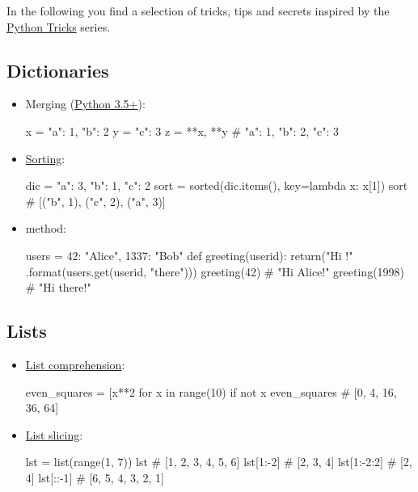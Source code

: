 \documentclass[rules]{cheatsheet}
\begin{document}
In the following you find a selection of tricks, tips and secrets inspired by the \href{https://realpython.com/python-tricks/}{Python Tricks} series.

\subsection{Dictionaries}

\begin{itemize}
  \item Merging (\href{https://docs.python.org/3/whatsnew/3.5.html}{Python 3.5+}):
  \begin{python}[gobble=4]
    x = {"a": 1, "b": 2}
    y = {"c": 3}
    z = {**x, **y} # {"a": 1, "b": 2, "c": 3}
  \end{python}

  \item \href{https://docs.python.org/3/howto/sorting.html}{Sorting}:
  \begin{python}[gobble=4]
    dic = {"a": 3, "b": 1, "c": 2}
    sort = sorted(dic.items(), key=lambda x: x[1])
    sort # [("b", 1), ("c", 2), ("a", 3)]
  \end{python}

  \item \href{https://docs.python.org/3/library/stdtypes.html#dict.get}{} method:
  \begin{python}[gobble=4]
    users = {42: "Alice", 1337: "Bob"}
    def greeting(userid):
      return("Hi {}!"
             .format(users.get(userid, "there")))
    greeting(42) # "Hi Alice!"
    greeting(1998) # "Hi there!"
  \end{python}
\end{itemize}

\subsection{Lists}

\begin{itemize}
  \item \href{https://docs.python.org/3/library/stdtypes.html#list}{List comprehension}:
  \begin{python}[gobble=4]
    even_squares = [x**2 for x in range(10)
                    if not x %
    even_squares # [0, 4, 16, 36, 64]
  \end{python}

  \item \href{https://docs.python.org/3/library/stdtypes.html#sequence-types-list-tuple-range}{List slicing}:
  \begin{python}[gobble=4]
    lst = list(range(1, 7))
    lst # [1, 2, 3, 4, 5, 6]
    lst[1:-2] # [2, 3, 4]
    lst[1:-2:2] # [2, 4]
    lst[::-1] # [6, 5, 4, 3, 2, 1]
  \end{python}
\end{itemize}
\end{document}
